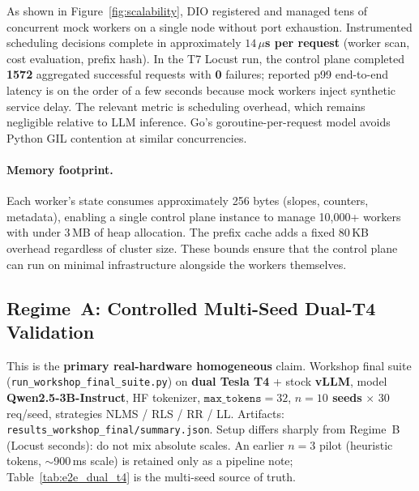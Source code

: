 \documentclass[10pt,twocolumn,letterpaper]{article}
\begin{document}
As shown in Figure~\ref{fig:scalability}, DIO registered and managed tens of concurrent mock workers on a single node without port exhaustion. Instrumented scheduling decisions complete in approximately \textbf{$14\,\mu$s per request} (worker scan, cost evaluation, prefix hash). In the T7 Locust run, the control plane completed \textbf{1572} aggregated successful requests with \textbf{0} failures; reported p99 end-to-end latency is on the order of a few seconds because mock workers inject synthetic service delay. The relevant metric is scheduling overhead, which remains negligible relative to LLM inference. Go's goroutine-per-request model avoids Python GIL contention at similar concurrencies.

\paragraph{Memory footprint.}
Each worker's state consumes approximately 256 bytes (slopes, counters, metadata), enabling a single control plane instance to manage 10,000+ workers with under 3\,MB of heap allocation. The prefix cache adds a fixed 80\,KB overhead regardless of cluster size. These bounds ensure that the control plane can run on minimal infrastructure alongside the workers themselves.

\subsection{Regime~A: Controlled Multi-Seed Dual-T4 Validation}
\label{sec:e2e_real}
This is the \textbf{primary real-hardware homogeneous} claim. Workshop final suite (\texttt{run\_workshop\_final\_suite.py}) on \textbf{dual Tesla T4} + stock \textbf{vLLM}, model \textbf{Qwen2.5-3B-Instruct}, HF tokenizer, $\texttt{max\_tokens}{=}32$, \textbf{$n{=}10$ seeds} $\times$ $30$ req/seed, strategies NLMS / RLS / RR / LL. Artifacts: \texttt{results\_workshop\_final/summary.json}. Setup differs sharply from Regime~B (Locust seconds): do not mix absolute scales. An earlier $n{=}3$ pilot (heuristic tokens, $\sim$900\,ms scale) is retained only as a pipeline note; Table~\ref{tab:e2e_dual_t4} is the multi-seed source of truth.
\end{document}

